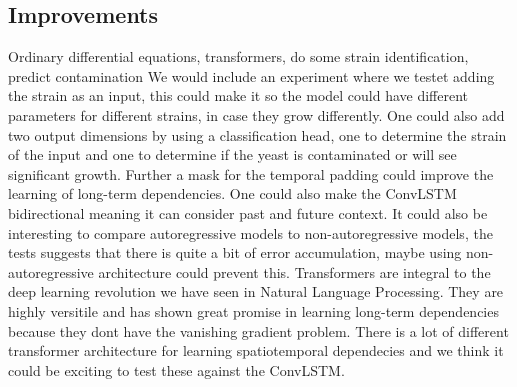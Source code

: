 \documentclass[a4paper,12pt]{article}
\begin{document}
\subsection{Improvements}
Ordinary differential equations, transformers, do some strain identification, predict contamination
We would include an experiment where we testet adding the strain as an input, this could make it so the model could have different parameters for different strains, in case they grow differently. One could also add two output dimensions by using a classification head, one to determine the strain of the input and one to determine if the yeast is contaminated or will see significant growth. 
Further a mask for the temporal padding could improve the learning of long-term dependencies. One could also make the ConvLSTM bidirectional meaning it can consider past and future context. It could also be interesting to compare autoregressive models to non-autoregressive models, the tests suggests that there is quite a bit of error accumulation, maybe using non-autoregressive architecture could prevent this.
Transformers are integral to the deep learning revolution we have seen in Natural Language Processing. They are highly versitile and has shown great promise in learning long-term dependencies because they dont have the vanishing gradient problem. There is a lot of different transformer architecture for learning spatiotemporal dependecies and we think it could be exciting to test these against the ConvLSTM.
\end{document}
